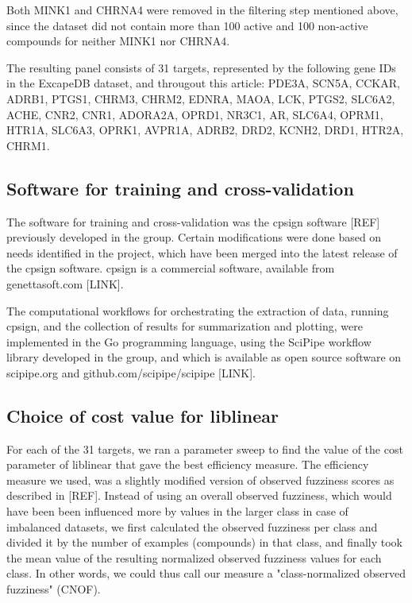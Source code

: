 \documentclass[utf8]{frontiersSCNS} %
\begin{document}
Both MINK1 and CHRNA4 were removed in the filtering step mentioned above, since
the dataset did not contain more than 100 active and 100 non-active compounds
for neither MINK1 nor CHRNA4.

The resulting panel consists of 31 targets, represented by the following gene
IDs in the ExcapeDB dataset, and througout this article: PDE3A,
SCN5A, CCKAR, ADRB1, PTGS1, CHRM3, CHRM2, EDNRA, MAOA, LCK,
PTGS2, SLC6A2, ACHE, CNR2, CNR1, ADORA2A, OPRD1, NR3C1, AR,
SLC6A4, OPRM1, HTR1A, SLC6A3, OPRK1, AVPR1A, ADRB2, DRD2,
KCNH2, DRD1, HTR2A, CHRM1.

\subsection{Software for training and cross-validation}

The software for training and cross-validation was the cpsign software [REF]
previously developed in the group. Certain modifications were done based on
needs identified in the project, which have been merged into the latest
release of the cpsign software. cpsign is a commercial software, available
from genettasoft.com [LINK].

The computational workflows for orchestrating the extraction of data, running
cpsign, and the collection of results for summarization and plotting, were
implemented in the Go programming language, using the SciPipe workflow library
developed in the group, and which is available as open source software on
scipipe.org and github.com/scipipe/scipipe [LINK].

\subsection{Choice of cost value for liblinear}

For each of the 31 targets, we ran a parameter sweep to find the value of the
cost parameter of liblinear that gave the best efficiency measure. The
efficiency measure we used, was a slightly modified version of observed
fuzziness scores as described in [REF]. Instead of using an overall observed
fuzziness, which would have been been influenced more by values in the larger
class in case of imbalanced datasets, we first calculated the observed
fuzziness per class and divided it by the number of examples (compounds) in
that class, and finally took the mean value of the resulting normalized
observed fuzziness values for each class. In other words, we could thus call
our measure a "class-normalized observed fuzziness" (CNOF).
\end{document}
